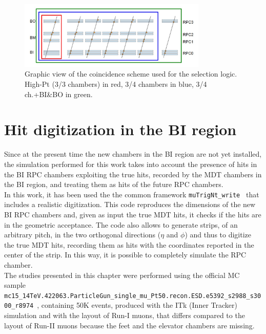 \begin{figure}[!h]
	\centering
	\includegraphics[width=0.8\textwidth]{Chapters/CH3/figures/trig_scheme}
	\caption{Graphic view of the coincidence scheme used for the selection logic. High-Pt (3/3 chambers) in red, 3/4 chambers in blue, 3/4 ch.+BI\&BO in green.}
	\label{fig:trig_scheme}
\end{figure}

\section{Hit digitization in the BI region}
\label{sec:hit_dig}
Since at the present time the new chambers in the BI region are not yet installed,
the simulation performed for this work takes into account the presence 
of hits in the BI RPC chambers exploiting the true hits, recorded 
by the MDT chambers in the BI region, and treating them as hits of the future RPC chambers.\\
In this work, it has been used the the common framework \texttt{muTrigNt\_write}~\cite{muTrigNt} that includes a realistic digitization.
This code reproduces the dimensions of the new BI RPC chambers and, 
given as input the true MDT hits, it checks if the hits are in the geometric 
acceptance.
The code also allows to generate strips, of an arbitrary pitch, in the two orthogonal directions ($\eta$ and $\phi$) and thus to digitize the true MDT hits, recording them as hits with the coordinates reported in the center of the strip.
In this way, it is possible to completely simulate the RPC chamber. \\
The studies presented in this chapter were performed using the official MC sample\\  {\scriptsize\texttt{mc15\_14TeV.422063.ParticleGun\_single\_mu\_Pt50.recon.ESD.e5392\_s2988\_s3000\_r8974}}~\cite{Muontwiki}, containing 50K events, produced with the ITk (Inner Tracker) simulation and with the layout of Run-I muons, that differs compared to the layout of Run-II muons because the feet and the elevator chambers are missing.
